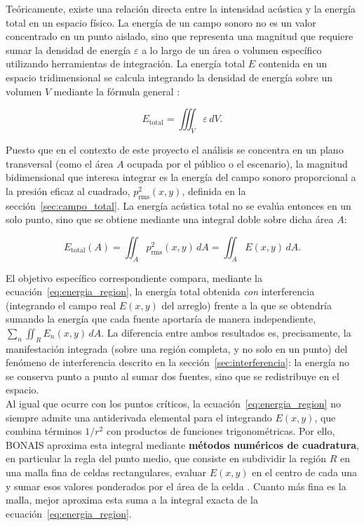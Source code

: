 \noindent Teóricamente, existe una relación directa entre la intensidad acústica y la energía total en un espacio físico. La energía de un campo sonoro no es un valor concentrado en un punto aislado, sino que representa una magnitud que requiere sumar la densidad de energía \(\varepsilon\) a lo largo de un área o volumen específico utilizando herramientas de integración. La energía total \(E\) contenida en un espacio tridimensional se calcula integrando la densidad de energía sobre un volumen \(V\) mediante la fórmula general \cite{kinsler2000}:

\begin{equation}
E_{\text{total}} = \iiint_V \varepsilon \, dV.
\end{equation}

\noindent Puesto que en el contexto de este proyecto el análisis se concentra en un plano transversal (como el área \(A\) ocupada por el público o el escenario), la magnitud bidimensional que interesa integrar es la energía del campo sonoro proporcional a la presión eficaz al cuadrado, \(p_{\text{rms}}^2(x,y)\), definida en la sección~\ref{sec:campo_total}. La energía acústica total no se evalúa entonces en un solo punto, sino que se obtiene mediante una integral doble sobre dicha área \(A\):

\begin{equation}
E_{\text{total}}(A) = \iint_A p_{\text{rms}}^2(x,y)\, dA
= \iint_A E(x,y)\, dA.
\label{eq:energia_region}
\end{equation}

\noindent El objetivo específico correspondiente compara, mediante la
ecuación~\eqref{eq:energia_region}, la energía total obtenida
\emph{con} interferencia (integrando el campo real \(E(x,y)\) del
arreglo) frente a la que se obtendría sumando la energía que cada
fuente aportaría de manera independiente, $\sum_n \iint_R E_n(x,y)\,
dA$. La diferencia entre ambos resultados es, precisamente, la
manifestación integrada (sobre una región completa, y no solo en un
punto) del fenómeno de interferencia descrito en la
sección~\ref{sec:interferencia}: la energía no se conserva punto a
punto al sumar dos fuentes, sino que se redistribuye en el espacio.\\

\noindent Al igual que ocurre con los puntos críticos, la
ecuación~\eqref{eq:energia_region} no siempre admite una antiderivada
elemental para el integrando \(E(x,y)\), que combina términos \(1/r^2\)
con productos de funciones trigonométricas. Por ello, BONAIS aproxima
esta integral mediante \textbf{métodos numéricos de cuadratura}, en
particular la regla del punto medio, que consiste en subdividir la
región \(R\) en una malla fina de celdas rectangulares, evaluar \(E(x,y)\)
en el centro de cada una y sumar esos valores ponderados por el área
de la celda \cite[sec.~4.4]{burden2011} \cite[sec.~4.8]{burden2011}. Cuanto más fina es la malla, mejor
aproxima esta suma a la integral exacta de la
ecuación~\eqref{eq:energia_region}.


